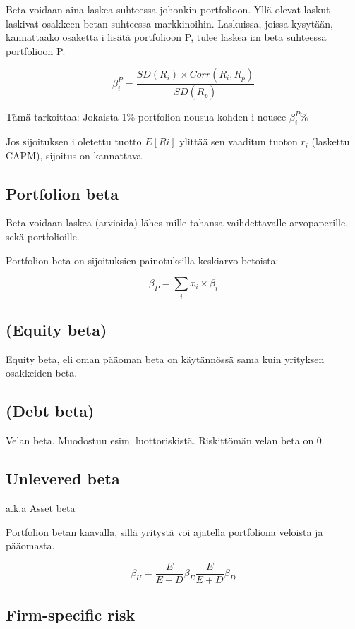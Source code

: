 \documentclass[a4paper]{article}
\begin{document}
Beta voidaan aina laskea suhteessa johonkin portfolioon. Yllä olevat laskut laskivat osakkeen betan suhteessa markkinoihin. Laskuissa, joissa kysytään, kannattaako osaketta i lisätä portfolioon P, tulee laskea i:n beta suhteessa portfolioon P.

\[
    \beta_i^P = \frac{SD(R_i) \times Corr(R_i, R_p)}{SD(R_p)}
\]

Tämä tarkoittaa: Jokaista 1\% portfolion nousua kohden i nousee $\beta_i^P\%$

Jos sijoituksen i oletettu tuotto $E[Ri]$ ylittää sen vaaditun tuoton $r_i$ (laskettu CAPM), sijoitus on kannattava.

\subsection{Portfolion beta}

Beta voidaan laskea (arvioida) lähes mille tahansa vaihdettavalle arvopaperille, sekä portfolioille.

Portfolion beta on sijoituksien painotuksilla keskiarvo betoista:

\[
    \beta_P = \sum_{i} x_i \times \beta_i
\]

\subsection{(Equity beta)}

Equity beta, eli oman pääoman beta on käytännössä sama kuin yrityksen osakkeiden beta.

\subsection{(Debt beta)}

Velan beta. Muodostuu esim. luottoriskistä. Riskittömän velan beta on 0.

\subsection{Unlevered beta}

a.k.a Asset beta

Portfolion betan kaavalla, sillä yritystä voi ajatella portfoliona veloista ja pääomasta.

\[
    \beta_U = \frac{E}{E + D} \beta_E \frac{E}{E + D} \beta_D
\]

\subsection{Firm-specific risk}
\end{document}

